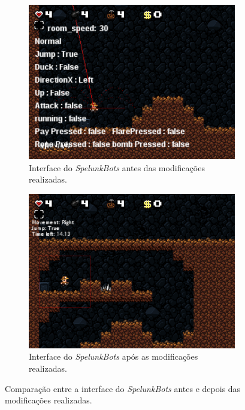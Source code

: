 \begin{figure}[H]
\centering
	\begin{subfigure}[b]{0.4\textwidth}
		\includegraphics[width=\textwidth]{fig/spelunkbots-gui-before.pdf}
        \caption{Interface do \textit{SpelunkBots} antes das modificações realizadas.}
		\label{fig:spelunkbots-gui-before}
	\end{subfigure}
	\begin{subfigure}[b]{0.4\textwidth}
		\includegraphics[width=\textwidth]{fig/spelunkbots-gui-after.pdf}
        \caption{Interface do \textit{SpelunkBots} após as modificações realizadas.}
		\label{fig:spelunkbots-gui-after}
	\end{subfigure}

    \caption{Comparação entre a interface do \textit{SpelunkBots} antes e
    depois das modificações realizadas.}
	\label{fig:spelunkbots-gui}
\end{figure}

